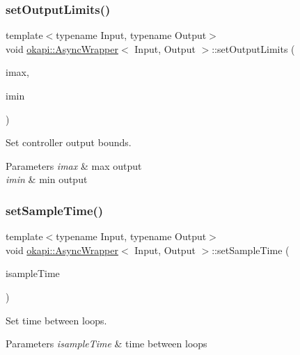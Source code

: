 \subsubsection{\texorpdfstring{setOutputLimits()}{setOutputLimits()}}
{\footnotesize\ttfamily template$<$typename Input, typename Output$>$ \\
void \mbox{\hyperlink{classokapi_1_1AsyncWrapper}{okapi\+::\+Async\+Wrapper}}$<$ Input, Output $>$\+::set\+Output\+Limits (\begin{DoxyParamCaption}\item[{const Output}]{imax,  }\item[{const Output}]{imin }\end{DoxyParamCaption})\hspace{0.3cm}{\ttfamily [inline]}}

Set controller output bounds.


\begin{DoxyParams}{Parameters}
{\em imax} & max output \\
\hline
{\em imin} & min output \\
\hline
\end{DoxyParams}
\mbox{\label{classokapi_1_1AsyncWrapper_afe14fb6e7727c313bd40cf74d28f0a14}} 
\subsubsection{\texorpdfstring{setSampleTime()}{setSampleTime()}}
{\footnotesize\ttfamily template$<$typename Input, typename Output$>$ \\
void \mbox{\hyperlink{classokapi_1_1AsyncWrapper}{okapi\+::\+Async\+Wrapper}}$<$ Input, Output $>$\+::set\+Sample\+Time (\begin{DoxyParamCaption}\item[{const Q\+Time \&}]{isample\+Time }\end{DoxyParamCaption})\hspace{0.3cm}{\ttfamily [inline]}}

Set time between loops.


\begin{DoxyParams}{Parameters}
{\em isample\+Time} & time between loops \\
\hline
\end{DoxyParams}
\mbox{\label{classokapi_1_1AsyncWrapper_aa4b9a4ff29aff5047425e239b574c3c6}} 
